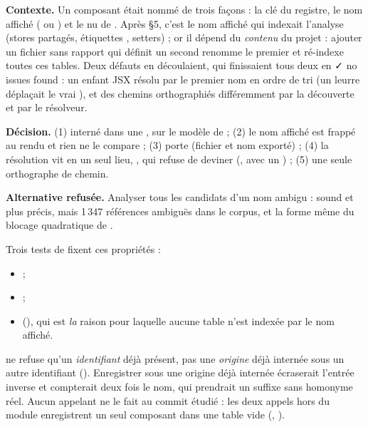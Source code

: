 \begin{decision}
\textbf{Contexte.} Un composant était nommé de trois façons : la clé  du registre, le nom affiché ( ou ) et le  nu de . Après  §5, c'est le nom affiché qui indexait l'analyse (stores partagés, étiquettes , setters) ; or il dépend du \emph{contenu} du projet : ajouter un fichier sans rapport qui définit un second  renomme le premier et ré-indexe toutes ces tables. Deux défauts en découlaient, qui finissaient tous deux en \og ✓ no issues found\fg{} : un enfant JSX résolu par le premier nom en ordre de tri (un leurre  déplaçait le vrai ), et des chemins orthographiés différemment par la découverte et par le résolveur.

\textbf{Décision.} (1)  interné dans une , sur le modèle de  ; (2) le nom affiché est frappé au rendu et rien ne le compare ; (3)  porte  (fichier et nom exporté) ; (4) la résolution vit en un seul lieu, , qui refuse de deviner (, avec un ) ; (5) une seule orthographe de chemin.

\textbf{Alternative refusée.} Analyser tous les candidats d'un nom ambigu : sound et plus précis, mais 1\,347 références ambiguës dans le corpus, et la forme même du blocage quadratique de .
\end{decision}

Trois tests de  fixent ces propriétés :
\begin{itemize}
  \item {} ;
  \item {} ;
  \item {\footnotesize{}} (), qui est \emph{la} raison pour laquelle aucune table n'est indexée par le nom affiché.
\end{itemize}

\begin{piege}
 ne refuse qu'un \emph{identifiant} déjà présent, pas une \emph{origine} déjà internée sous un autre identifiant (). Enregistrer sous  une origine déjà internée écraserait l'entrée inverse et compterait deux fois le nom, qui prendrait un suffixe  sans homonyme réel. Aucun appelant ne le fait au commit étudié : les deux appels hors du module enregistrent un seul composant dans une table vide (, ).
\end{piege}

